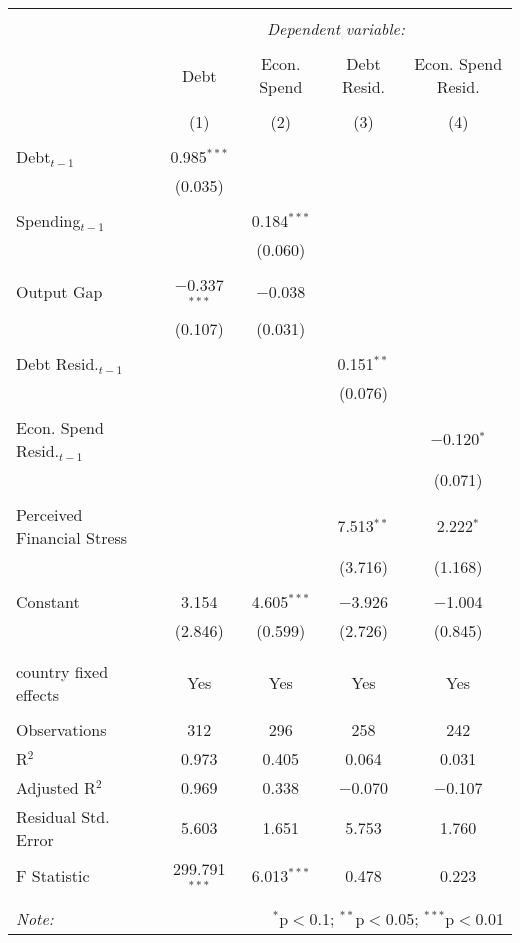 
\begingroup 
\tiny 
\begin{tabular}{@{\extracolsep{5pt}}lcccc} 
\\[-1.8ex]\hline 
\hline \\[-1.8ex] 
 & \multicolumn{4}{c}{\textit{Dependent variable:}} \\ 
\cline{2-5} 
\\[-1.8ex] & Debt & Econ. Spend & Debt Resid. & Econ. Spend Resid. \\ 
\\[-1.8ex] & (1) & (2) & (3) & (4)\\ 
\hline \\[-1.8ex] 
 Debt$_{t-1}$ & 0.985$^{***}$ &  &  &  \\ 
  & (0.035) &  &  &  \\ 
  & & & & \\ 
 Spending$_{t-1}$ &  & 0.184$^{***}$ &  &  \\ 
  &  & (0.060) &  &  \\ 
  & & & & \\ 
 Output Gap & $-$0.337$^{***}$ & $-$0.038 &  &  \\ 
  & (0.107) & (0.031) &  &  \\ 
  & & & & \\ 
 Debt Resid.$_{t-1}$ &  &  & 0.151$^{**}$ &  \\ 
  &  &  & (0.076) &  \\ 
  & & & & \\ 
 Econ. Spend Resid.$_{t-1}$ &  &  &  & $-$0.120$^{*}$ \\ 
  &  &  &  & (0.071) \\ 
  & & & & \\ 
 Perceived Financial Stress &  &  & 7.513$^{**}$ & 2.222$^{*}$ \\ 
  &  &  & (3.716) & (1.168) \\ 
  & & & & \\ 
 Constant & 3.154 & 4.605$^{***}$ & $-$3.926 & $-$1.004 \\ 
  & (2.846) & (0.599) & (2.726) & (0.845) \\ 
  & & & & \\ 
\hline \\[-1.8ex] 
country fixed effects & Yes & Yes & Yes & Yes \\ 
\hline \\[-1.8ex] 
Observations & 312 & 296 & 258 & 242 \\ 
R$^{2}$ & 0.973 & 0.405 & 0.064 & 0.031 \\ 
Adjusted R$^{2}$ & 0.969 & 0.338 & $-$0.070 & $-$0.107 \\ 
Residual Std. Error & 5.603 & 1.651 & 5.753 & 1.760 \\ 
F Statistic & 299.791$^{***}$ & 6.013$^{***}$ & 0.478 & 0.223 \\ 
\hline 
\hline \\[-1.8ex] 
\textit{Note:}  & \multicolumn{4}{r}{$^{*}$p$<$0.1; $^{**}$p$<$0.05; $^{***}$p$<$0.01} \\ 
\end{tabular} 
\endgroup 
